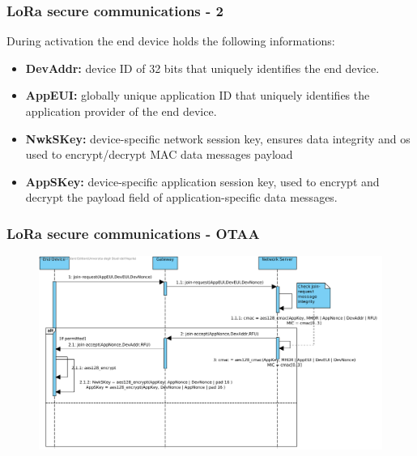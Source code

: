 \begin{frame}[fragile]
  \frametitle{LoRa secure communications - 2}
  During activation the end device holds the following informations:
  \begin{itemize}
      \item \textbf{DevAddr:} device ID of 32 bits that uniquely identifies the end device.
      \item \textbf{AppEUI:} globally unique application ID that uniquely identifies the application provider of the end device.
      \item \textbf{NwkSKey:} device-specific network session key, ensures data integrity and os used to encrypt/decrypt MAC data messages payload
      \item \textbf{AppSKey:} device-specific application session key, used to encrypt and decrypt the payload field of application-specific data messages.
  \end{itemize}
\end{frame}


\begin{frame}[fragile]
  \frametitle{LoRa secure communications - OTAA}
 \begin{figure}
  \centering
  \includegraphics[width=\textwidth]{img/lora_secure.png}
  \end{figure}
\end{frame}

